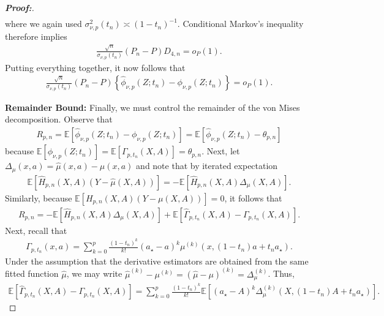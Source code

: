 \documentclass[11pt,twoside]{article}
\theoremstyle{definition}
\theoremstyle{remark}
\begin{document}
\begin{proof}[\textbf{Proof:}]
\begin{align*}
\end{align*}
where we again used $\sigma_{\nu,p}^2(t_n)\asymp(1-t_n)^{-1}$.
Conditional Markov's inequality therefore implies
\begin{align*}
     \frac{\sqrt{n}}{\sigma_{\nu,p}(t_n)} (P_n-P)D_{4,n} = o_P(1).
\end{align*}
Putting everything together, it now follows that
\begin{align*}
      \frac{\sqrt{n}}{\sigma_{\nu,p}(t_n)} (P_n-P) \left\{ \widehat{\phi}_{\nu, p}(Z; t_n) -\phi_{\nu, p}(Z; t_n) \right\} = o_P(1).
\end{align*}
\medskip 

\textbf{Remainder Bound:} Finally, we must control the remainder of the von Mises decomposition. Observe that
\begin{align*}
      R_{p,n} = \mathbb{E}\!\left[ \widehat\phi_{\nu,p}(Z;t_n) - \phi_{\nu,p}(Z;t_n)\right] = \mathbb{E}\!\left[ \widehat\phi_{\nu,p}(Z;t_n) - \theta_{p, n}\right]
\end{align*}
because $\mathbb{E}\!\left[\phi_{\nu,p}(Z;t_n) \right] = \mathbb{E}\!\left[ \Gamma_{p,t_n}(X,A) \right] = \theta_{p,n}$. Next, let $ \Delta_\mu(x,a) = \widehat\mu(x,a)-\mu(x,a)$ and note that by iterated expectation 
\begin{align*}
    \mathbb{E}\!\left[\widehat H_{p,n}(X,A)(Y-\widehat\mu(X,A))\right] = - \mathbb{E}\!\left[ \widehat H_{p,n}(X,A) \Delta_\mu(X,A)\right].
\end{align*}
Similarly, because $\mathbb{E}\!\left[H_{p,n}(X,A)(Y-\mu(X,A))\right] = 0$, it follows that
\begin{align*}
    R_{p,n} = - \mathbb{E}\!\left[ \widehat H_{p,n}(X,A) \Delta_\mu(X,A)\right] + \mathbb{E}\!\left[ \widehat\Gamma_{p,t_n}(X,A) - \Gamma_{p,t_n}(X,A) \right].
\end{align*}
Next, recall that 
\begin{align*}
     \Gamma_{p,t_n}(x,a) = \sum_{k=0}^{p} \frac{(1-t_n)^k}{k!} (a_\star-a)^k \mu^{(k)} \!\left(x,(1-t_n)a + t_n a_\star \right).
\end{align*}
Under the assumption that the derivative estimators are obtained from the same fitted function $\widehat\mu$, we may write $\widehat\mu^{(k)}-\mu^{(k)} = (\widehat\mu-\mu)^{(k)} = \Delta_\mu^{(k)}$. Thus,
\begin{align*}
    \mathbb{E}\!\left[ \widehat\Gamma_{p,t_n}(X,A) - \Gamma_{p,t_n}(X,A)\right] = \sum_{k=0}^{p} \frac{(1-t_n)^k}{k!} \mathbb{E}\!\left[(a_\star-A)^k \Delta_\mu^{(k)}\!\left( X,(1-t_n)A+t_na_\star\right) \right].

\end{align*}
\end{proof}
\end{document}
